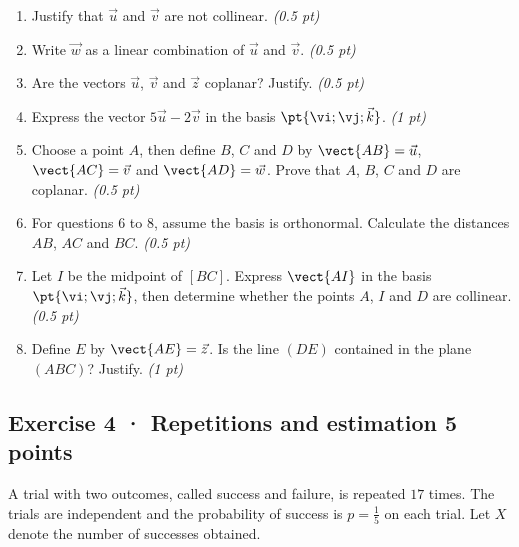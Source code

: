 \begin{enumerate}

\item Justify that $\vec u$ and $\vec v$ are not collinear. \hfill\textit{(0.5 pt)}

\item Write $\vec w$ as a linear combination of $\vec u$ and $\vec v$. \hfill\textit{(0.5 pt)}

\item Are the vectors $\vec u$, $\vec v$ and $\vec z$ coplanar? Justify. \hfill\textit{(0.5 pt)}

\item Express the vector $5\vec u-2\vec v$ in the basis $\pt{\vi;\vj;\vec k}$. \hfill\textit{(1 pt)}

\item Choose a point $A$, then define $B$, $C$ and $D$ by $\vect{AB}=\vec u$, $\vect{AC}=\vec v$ and $\vect{AD}=\vec w$. Prove that $A$, $B$, $C$ and $D$ are coplanar. \hfill\textit{(0.5 pt)}

\item For questions 6 to 8, assume the basis is orthonormal. Calculate the distances $AB$, $AC$ and $BC$. \hfill\textit{(0.5 pt)}

\item Let $I$ be the midpoint of $[BC]$. Express $\vect{AI}$ in the basis $\pt{\vi;\vj;\vec k}$, then determine whether the points $A$, $I$ and $D$ are collinear. \hfill\textit{(0.5 pt)}

\item Define $E$ by $\vect{AE}=\vec z$. Is the line $(DE)$ contained in the plane $(ABC)$? Justify. \hfill\textit{(1 pt)}

\end{enumerate}

\subsection*{Exercise 4 · Repetitions and estimation \hfill 5 points}A trial with two outcomes, called success and failure, is repeated $17$ times. The trials are independent and the probability of success is $p=\frac{1}{5}$ on each trial. Let $X$ denote the number of successes obtained.

